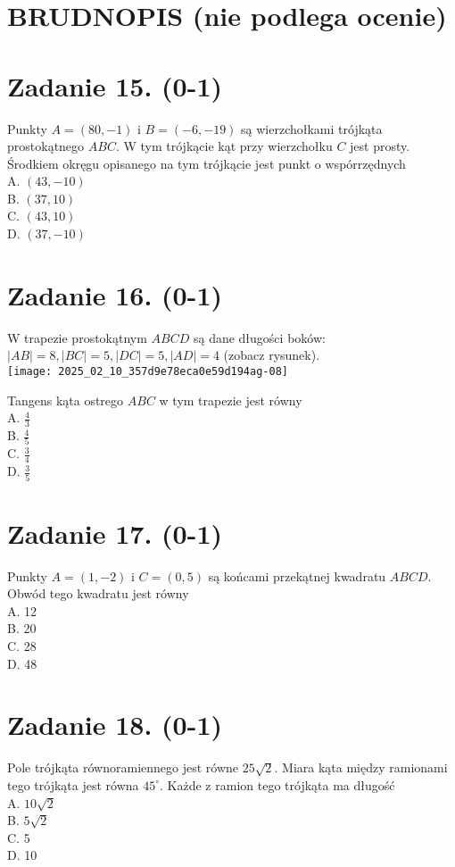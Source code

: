 \documentclass[10pt]{article}
\begin{document}
\section*{BRUDNOPIS (nie podlega ocenie)}
\section*{Zadanie 15. (0-1)}
Punkty \(A=(80,-1)\) i \(B=(-6,-19)\) są wierzchołkami trójkąta prostokątnego \(A B C\). W tym trójkącie kąt przy wierzchołku \(C\) jest prosty. Środkiem okręgu opisanego na tym trójkącie jest punkt o wspórrzędnych\\
A. \((43,-10)\)\\
B. \((37,10)\)\\
C. \((43,10)\)\\
D. \((37,-10)\)

\section*{Zadanie 16. (0-1)}
W trapezie prostokątnym \(A B C D\) są dane długości boków: \(|A B|=8,|B C|=5,|D C|=5,|A D|=4\) (zobacz rysunek).\\
\texttt{[image: 2025\_02\_10\_357d9e78eca0e59d194ag-08]}

Tangens kąta ostrego \(A B C\) w tym trapezie jest równy\\
A. \(\frac{4}{3}\)\\
B. \(\frac{4}{5}\)\\
C. \(\frac{3}{4}\)\\
D. \(\frac{3}{5}\)

\section*{Zadanie 17. (0-1)}
Punkty \(A=(1,-2)\) i \(C=(0,5)\) są końcami przekątnej kwadratu \(A B C D\). Obwód tego kwadratu jest równy\\
A. 12\\
B. 20\\
C. 28\\
D. 48

\section*{Zadanie 18. (0-1)}
Pole trójkąta równoramiennego jest równe \(25 \sqrt{2}\). Miara kąta między ramionami tego trójkąta jest równa \(45^{\circ}\). Każde z ramion tego trójkąta ma długość\\
A. \(10 \sqrt{2}\)\\
B. \(5 \sqrt{2}\)\\
C. 5\\
D. 10
\end{document}
